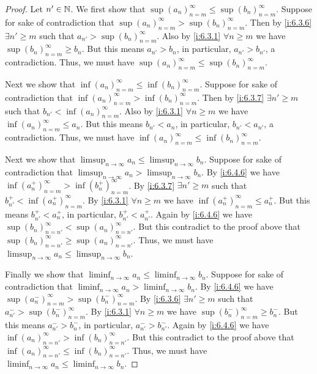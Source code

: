 \begin{proof}
  Let \(n' \in \mathbb{N}\).
  We first show that \(\sup(a_n)_{n = m}^\infty \leq \sup(b_n)_{n = m}^\infty\).
  Suppose for sake of contradiction that \(\sup(a_n)_{n = m}^\infty > \sup(b_n)_{n = m}^\infty\).
  Then by \cref{i:6.3.6} \(\exists n' \geq m\) such that \(a_{n'} > \sup(b_n)_{n = m}^\infty\).
  Also by \cref{i:6.3.1} \(\forall n \geq m\) we have \(\sup(b_n)_{n = m}^\infty \geq b_n\).
  But this means \(a_{n'} > b_n\), in particular, \(a_{n'} > b_{n'}\), a contradiction.
  Thus, we must have \(\sup(a_n)_{n = m}^\infty \leq \sup(b_n)_{n = m}^\infty\).

  Next we show that \(\inf(a_n)_{n = m}^\infty \leq \inf(b_n)_{n = m}^\infty\).
  Suppose for sake of contradiction that \(\inf(a_n)_{n = m}^\infty > \inf(b_n)_{n = m}^\infty\).
  Then by \cref{i:6.3.7} \(\exists n' \geq m\) such that \(b_{n'} < \inf(a_n)_{n = m}^\infty\).
  Also by \cref{i:6.3.1} \(\forall n \geq m\) we have \(\inf(a_n)_{n = m}^\infty \leq a_n\).
  But this means \(b_{n'} < a_n\), in particular, \(b_{n'} < a_{n'}\), a contradiction.
  Thus, we must have \(\inf(a_n)_{n = m}^\infty \leq \inf(b_n)_{n = m}^\infty\).

  Next we show that \(\limsup_{n \to \infty} a_n \leq \limsup_{n \to \infty} b_n\).
  Suppose for sake of contradiction that \(\limsup_{n \to \infty} a_n > \limsup_{n \to \infty} b_n\).
  By \cref{i:6.4.6} we have \(\inf(a_n^+)_{n = m}^\infty > \inf(b_n^+)_{n = m}^\infty\).
  By \cref{i:6.3.7} \(\exists n' \geq m\) such that \(b_{n'}^+ < \inf(a_n^+)_{n = m}^\infty\).
  By \cref{i:6.3.1} \(\forall n \geq m\) we have \(\inf(a_n^+)_{n = m}^\infty \leq a_n^+\).
  But this means \(b_{n'}^+ < a_n^+\), in particular, \(b_{n'}^+ < a_{n'}^+\).
  Again by \cref{i:6.4.6} we have \(\sup(b_n)_{n = n'}^\infty < \sup(a_n)_{n = n'}^\infty\).
  But this contradict to the proof above that \(\sup(b_n)_{n = n'}^\infty \geq \sup(a_n)_{n = n'}^\infty\).
  Thus, we must have \(\limsup_{n \to \infty} a_n \leq \limsup_{n \to \infty} b_n\).

  Finally we show that \(\liminf_{n \to \infty} a_n \leq \liminf_{n \to \infty} b_n\).
  Suppose for sake of contradiction that \(\liminf_{n \to \infty} a_n > \liminf_{n \to \infty} b_n\).
  By \cref{i:6.4.6} we have \(\sup(a_n^-)_{n = m}^\infty > \sup(b_n^-)_{n = m}^\infty\).
  By \cref{i:6.3.6} \(\exists n' \geq m\) such that \(a_{n'}^- > \sup(b_n^-)_{n = m}^\infty\).
  By \cref{i:6.3.1} \(\forall n \geq m\) we have \(\sup(b_n^-)_{n = m}^\infty \geq b_n^-\).
  But this means \(a_{n'}^- > b_n^-\), in particular, \(a_{n'}^- > b_{n'}^-\).
  Again by \cref{i:6.4.6} we have \(\inf(a_n)_{n = n'}^\infty > \inf(b_n)_{n = n'}^\infty\).
  But this contradict to the proof above that \(\inf(a_n)_{n = n'}^\infty \leq \inf(b_n)_{n = n'}^\infty\).
  Thus, we must have \(\liminf_{n \to \infty} a_n \leq \liminf_{n \to \infty} b_n\).
\end{proof}

